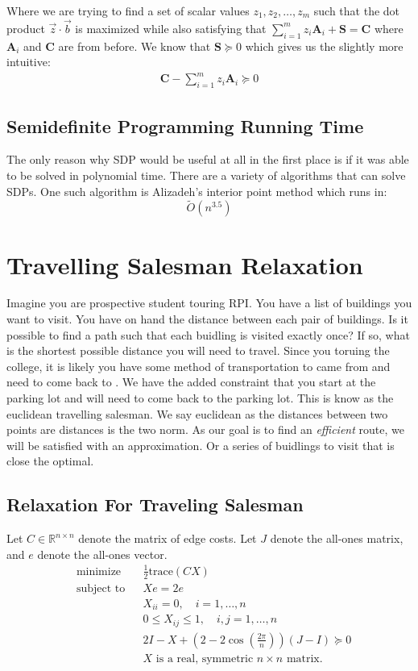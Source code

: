 \documentclass{article}
\begin{document}
Where we are trying to find a set of scalar values \( z_1, z_2, \ldots, z_m \) such that the dot product \( \vec{z} \cdot \vec{b} \) is maximized while also satisfying that \( \sum_{i=1}^m z_i \mathbf{A}_{i} + \mathbf{S} = \mathbf{C} \) where \( \mathbf{A}_i \) and \( \mathbf{C} \) are from before.
We know that \( \mathbf{S} \succeq 0 \) which gives us the slightly more intuitive:
\begin{align*}
\mathbf{C} - \sum_{i = 1}^m z_i \mathbf{A}_i \succeq 0
\end{align*}

\subsection{Semidefinite Programming Running Time}
The only reason why SDP would be useful at all in the first place is if it was able to be solved in polynomial time.
There are a variety of algorithms that can solve SDPs. 
One such algorithm is Alizadeh's interior point method which runs in:
\[ \tilde{O}(n^{3.5}) \]

\section{Travelling Salesman Relaxation}   %
Imagine you are prospective student touring RPI. You have a list of buildings you want to visit.
You have on hand the distance between each pair of buildings. 
Is it possible to find a path such that each buidling is visited exactly once? 
If so, what is the shortest possible distance you will need to travel. 
Since you toruing the college, it is likely you have some method of transportation to came from and need to come back to . 
We have the added constraint that you start at the parking lot and will need to come back to the parking lot.
This is know as the euclidean travelling salesman. We say euclidean as the distances between two points are distances is the 
two norm. 
As our goal is to find an \emph{efficient} route, we will be satisfied with an approximation. 
Or a series of buidlings to visit that is close the optimal.
\subsection{Relaxation For Traveling Salesman}
Let $C \in \mathbb{R}^{n \times n}$ denote the matrix of edge costs. Let $J$ denote the all-ones matrix, and $e$ denote the all-ones vector.
\begin{equation*}
\begin{aligned}
& {\text{minimize}}
& & \frac{1}{2}\text{trace}(CX) \\
& \text{subject to}
& & Xe = 2e \\
&&& X_{ii} = 0, \quad i = 1,\ldots,n\\
&&& 0 \leq X_{ij} \leq 1, \quad i,j = 1,\ldots,n \\
&&& 2I - X + (2-2\cos\left(\frac{2\pi}{n}\right))(J-I) \succeq 0 \\
&&& X \text{ is a real, symmetric } n \times n \text{ matrix}.
\end{aligned}
\end{equation*}
\end{document}
